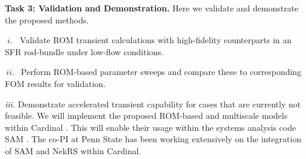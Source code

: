 \noindent
\textbf{Task 3: Validation and Demonstration.} 
Here we validate and demonstrate the proposed methods.
\\[-3ex]
\begin{description}
\item{$\; i.\; \;$}
Validate ROM transient calculations with high-fidelity counterparts
in an SFR rod-bundle under low-flow conditions.
\\[-4ex]
\item{$\, ii. \,\;$}
Perform ROM-based parameter sweeps and compare these to corresponding
FOM results for validation.
\\[-4ex]
\item{\em iii.}
Demonstrate accelerated transient capability for cases that are currently not
feasible. We will implement the proposed ROM-based and multiscale models within
Cardinal \cite{cardinal}. This will enable their usage within the systems
analysis code SAM \cite{hu2021}. The co-PI at Penn State has been working
extensively on the integration of SAM and NekRS within Cardinal.
\\[-2ex]
\end{description}
